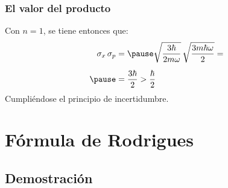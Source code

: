 \documentclass[12pt]{beamer}
\begin{document}
\begin{frame}
\frametitle{El valor del producto}
Con $n = 1$, se tiene entonces que:
\pause
\begin{eqnarray*}
\begin{aligned}
\sigma_{x} \, \sigma_{p} &= \pause \sqrt{\dfrac{3 \hbar}{2 m \omega}} \, \sqrt{\dfrac{3 m \hbar \omega}{2}} = \\[0.5em] \pause
&= \dfrac{3 \hbar}{2} > \dfrac{\hbar}{2}
\end{aligned}
\end{eqnarray*}
\pause
Cumpliéndose el principio de incertidumbre.
\end{frame}

\section{Fórmula de Rodrigues}
\subsection{Demostración}
\end{document}
